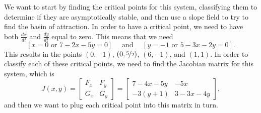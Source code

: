 \begin{exampleSol}
We want to start by finding the critical points for this system, classifying them to determine if they are asymptotically stable, and then use a slope field to try to find the basin of attraction. In order to have a critical point, we need to have both $\frac{dx}{dt}$ and $\frac{dy}{dt}$ equal to zero. This means that we need
\begin{equation*}
\left[ x=0 \text{ or } 7-2x-5y = 0\right] \quad \text{ and } \quad \left[ y=-1 \text{ or } 5 - 3x - 2y = 0 \right]. 
\end{equation*}
This results in the points $(0, -1)$, $\left(0, \nicefrac{5}{2}\right)$, $(6, -1)$, and $(1, 1)$. In order to classify each of these critical points, we need to find the Jacobian matrix for this system, which is
\begin{equation*}
J(x,y) = \begin{bmatrix} F_x & F_y \\ G_x & G_y \end{bmatrix} = \begin{bmatrix} 7-4x-5y & -5x \\ -3(y+1) & 3 - 3x - 4y \end{bmatrix},
\end{equation*}
and then we want to plug each critical point into this matrix in turn. 


\end{exampleSol}
